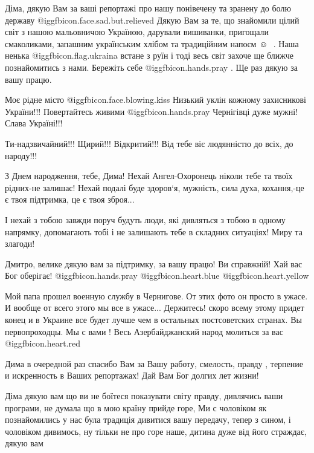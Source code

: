 \begin{itemize}

Діма, дякую Вам за ваші репортажі про нашу понівечену та зранену до болю
державу  @igg{fbicon.face.sad.but.relieved}  Дякую Вам за те, що знайомили цілий світ з нашою мальовничою
Україною, дарували вишиванки, пригощали смаколиками, запашним українським
хлібом та традиційним напоєм ☺ ️ . Наша ненька @igg{fbicon.flag.ukraina} встане з руїн і тоді весь світ
захоче ще ближче познайомитись з нами. Бережіть себе @igg{fbicon.hands.pray} . Ще раз дякую за вашу
працю.

Моє рідне місто @igg{fbicon.face.blowing.kiss} 
Низький уклін кожному захисникові України!!! Повертайтесь живими @igg{fbicon.hands.pray} 
Чернігівці дуже мужні!
Слава Україні!!!


Ти-надзвичайний!!! Щирий!!! Відкритий!!! Від тебе віє людянністю до всіх, до народу!!!

З Днем народження, тебе, Дима! Нехай Ангел-Охоронець ніколи тебе та твоїх
рідних-не залишає! Нехай подалі буде здоров‘я, мужність, сила духа, кохання,-це є
твоя підтримка, це є твоя зброя...

І нехай з тобою завжди поруч будуть люди, які дивляться з тобою в одному напрямку, допомагають тобі і не залишають тебе в складних ситуаціях! Миру та злагоди!


Дмитро, велике дякую вам за підтримку, за вашу працю! Ви справжній! Хай вас Бог
оберігає!  @igg{fbicon.hands.pray}  @igg{fbicon.heart.blue}  @igg{fbicon.heart.yellow} 


Мой папа прошел военную службу в Чернигове. От этих фото он просто в ужасе. И
вообще от всего этого мы все в ужасе... Держитесь! скоро всему этому придет
конец и в Украине все будет лучше чем в остальных постсоветских странах. Вы
первопроходцы. Мы с вами ! Весь Азербайджанский народ молиться за вас @igg{fbicon.heart.red}


Дима в очередной раз спасибо Вам за Вашу работу, смелость, правду , терпение и
искренность в Ваших репортажах! Дай Вам Бог долгих лет жизни!


Діма дякую вам що ви не боїтеся показувати світу правду, дивлячись ваши
програми, не думала що в мою країну прийде горе, Ми с чоловіком як познайомились
у нас була традиція дивитися вашу передачу, тепер з сином, і чоловіком
дивимось, ну тільки не про горе наше, дитина дуже від його страждає, дякую вам


\end{itemize}
